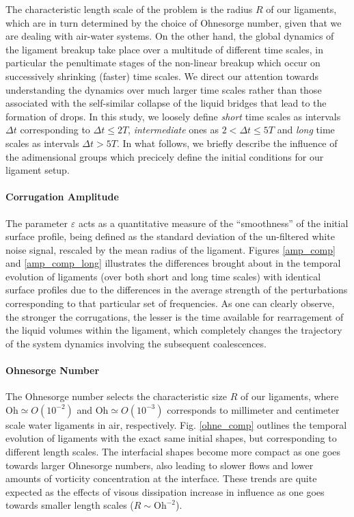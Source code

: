 The characteristic length scale of the problem is the radius $R$ of our ligaments, 
which are in turn determined by the choice of Ohnesorge number, given that we are dealing with air-water systems.
On the other hand, the global dynamics of the ligament breakup take place over a multitude of different time scales, 
in particular the penultimate stages of the non-linear breakup which occur on successively shrinking (faster) time scales.  
We direct our attention towards understanding the dynamics over much larger time scales rather than those  
associated with the self-similar collapse of the liquid bridges that lead to the formation of drops. 
In this study, we loosely define \textit{short} time scales as intervals $\Delta t$ corresponding 
to $ \Delta t \leq 2T $, \textit{intermediate} ones as $ 2 < \Delta t \leq 5T $ 
and \textit{long} time scales as intervals $\Delta t > 5T$. 
In what follows, we briefly describe the influence of the adimensional 
groups which precicely define the initial conditions for our ligament setup.  


\paragraph{Corrugation Amplitude}
The parameter $\varepsilon$ acts as a quantitative measure of the ``smoothness'' 
of the initial surface profile, being defined as the standard deviation 
of the un-filtered white noise signal, rescaled by the mean radius of the ligament.
Figures \ref{amp_comp} and \ref{amp_comp_long} illustrates the differences brought about in the temporal
evolution of ligaments (over both short and long time scales) with identical surface profiles 
due to the differences in the average strength of the perturbations corresponding to that particular set of frequencies. 
As one can clearly observe, the stronger the corrugations, 
the lesser is the time available for rearragement of the liquid 
volumes within the ligament, which completely changes the trajectory of 
the system dynamics involving the subsequent coalescences.    

\paragraph{Ohnesorge Number}
The Ohnesorge number selects the characteristic size $R$ of our ligaments, 
where $\textrm{Oh} \simeq O(10^{-2})$ and $\textrm{Oh} \simeq O(10^{-3})$ corresponds to 
millimeter and centimeter scale water ligaments in air, respectively.  
Fig. \ref{ohne_comp} outlines the temporal evolution of ligaments with   
the exact same initial shapes, but corresponding to different length scales. 
The interfacial shapes become more compact as one goes towards larger Ohnesorge
numbers, also leading to slower flows and lower amounts of vorticity concentration at the interface.  
These trends are quite expected as the effects of visous dissipation increase in influence
as one goes towards smaller length scales ($R \sim \textrm{Oh}^{-2}$).

